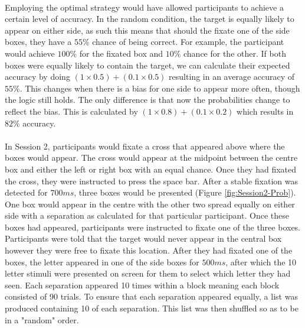 \documentclass[12pt]{article}
\begin{document}
\paragraph{} Employing the optimal strategy would have allowed participants to achieve a certain level of accuracy. In the random condition, the target is equally likely to appear on either side, as such this means that should the fixate one of the side boxes, they have a $55\%$ chance of being correct. For example, the participant would achieve $100\%$ for the fixated box and $10\%$ chance for the other. If both boxes were equally likely to contain the target, we can calculate their expected accuracy by doing $(1 \times 0.5) + (0.1 \times 0.5)$ resulting in an average accuracy of $55\%$. This changes when there is a bias for one side to appear more often, though the logic still holds. The only difference is that now the probabilities change to reflect the bias. This is calculated by $(1 \times 0.8) + (0.1 \times 0.2)$ which results in $82\%$ accuracy.

\paragraph{} In Session 2, participants would fixate a cross that appeared above where the boxes would appear. The cross would appear at the midpoint between the centre box and either the left or right box with an equal chance. Once they had fixated the cross, they were instructed to press the space bar. After a stable fixation was detected for $700ms$, three boxes would be presented (Figure \ref{fig:Session2-Prob}). One box would appear in the centre with the other two spread equally on either side with a separation as calculated for that particular participant. Once these boxes had appeared, participants were instructed to fixate one of the three boxes. Participants were told that the target would never appear in the central box however they were free to fixate this location. After they had fixated one of the boxes, the letter appeared in one of the side boxes for $500ms$, after which the 10 letter stimuli were presented on screen for them to select which letter they had seen. Each separation appeared 10 times within a block meaning each block consisted of 90 trials. To ensure that each separation appeared equally, a list was produced containing 10 of each separation. This list was then shuffled so as to be in a "random" order.
\end{document}

